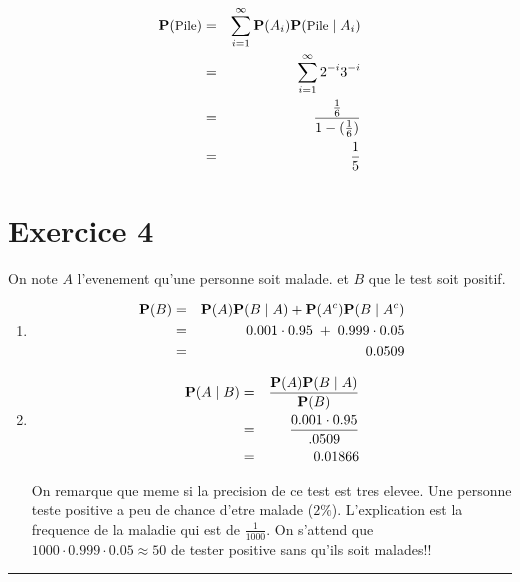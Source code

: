 \documentclass[a4paper]{tufte-handout}
\begin{document}
\begin{eqnarray*}
  \P(\text{\small Pile})  & = & \sum_{i=1}^\infty \P(A_i)\P(\text{\small
  Pile}\;|\;A_i)\\
                          & = & \sum_{i=1}^\infty 2^{-i}3^{-i}\\
                          & = & \frac{\frac{1}{6}}{1 - (\frac{1}{6})}\\
                          & = & \frac{1}{5}
\end{eqnarray*}

\section{Exercice 4}
On note $A$ l'evenement qu'une personne soit malade. et $B$ que le test soit
positif.\\

\begin{enumerate}
  \item 
    \begin{eqnarray*}
      \P(B) & = & \P(A)\P(B\;|\;A)  + \P(A^c)\P(B\;|\;A^c)\\
            & = & 0.001\cdot 0.95\;+\; 0.999\cdot 0.05\\
            & = & 0.0509
    \end{eqnarray*}
  \item 
 \begin{eqnarray*}
   \P(A\;|\;B) &=& \frac{\P(A)\P(B\;|\;A)}{\P(B)} \\
               &=& \frac{0.001\cdot 0.95}{.0509}\\
               &=& 0.01866
 \end{eqnarray*}

  { \scriptsize
   On remarque que meme si la precision de ce test est tres elevee. Une personne
   teste positive a peu de chance d'etre malade ($2\%$). L'explication est la
   frequence de la maladie qui est de $\frac{1}{1000}$. On s'attend que
   $1000 \cdot 0.999\cdot 0.05\approx 50$ de tester positive sans qu'ils soit
   malades!!
 }
 
\end{enumerate}

\hrule
\end{document}
